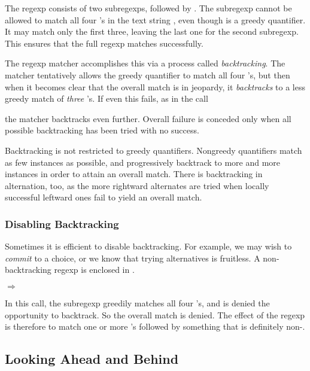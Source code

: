 
The regexp consists of two subregexps,  followed by .
The subregexp  cannot be allowed to match all four 's
in the text string , even though \code{*} is a greedy
quantifier.  It may match only the first three, leaving the last one
for the second subregexp.  This ensures that the full regexp matches
successfully.

The regexp matcher accomplishes this via a process called
\emph{backtracking}.  The matcher tentatively allows the greedy
quantifier to match all four 's, but then when it becomes
clear that the overall match is in jeopardy, it \emph{backtracks} to a
less greedy match of {\em three} 's.  If even this fails, as
in the call


the matcher backtracks even further.  Overall failure is conceded only
when all possible backtracking has been tried with no success.

Backtracking is not restricted to greedy quantifiers.  Nongreedy
quantifiers match as few instances as possible, and progressively
backtrack to more and more instances in order to attain an overall
match.  There is backtracking in alternation, too, as the more
rightward alternates are tried when locally successful leftward ones
fail to yield an overall match.

\subsubsection {Disabling Backtracking}

Sometimes it is efficient to disable backtracking.  For example, we
may wish to \emph{commit} to a choice, or we know that trying
alternatives is fruitless.  A non-backtracking regexp is enclosed in
\etc\code{)}.

 $\Rightarrow$ 

In this call, the subregexp  greedily matches all four
's, and is denied the opportunity to backtrack.  So the
overall match is denied.  The effect of the regexp is therefore to
match one or more 's followed by something that is definitely
non-.

\subsection {Looking Ahead and Behind}

